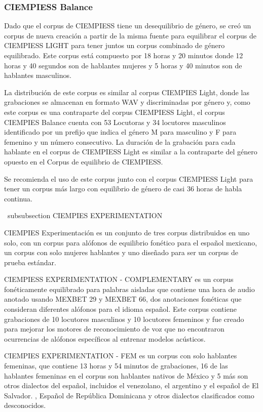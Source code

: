 \documentclass[a4paper,12pt,twoside]{report}
\begin{document}
\subsubsection{CIEMPIESS Balance}

Dado que el corpus de CIEMPIESS tiene un desequilibrio de género, se creó un corpus de nueva creación a partir de la misma fuente para equilibrar el corpus de CIEMPIESS LIGHT para tener juntos un corpus combinado de género equilibrado. Este corpus está compuesto por 18 horas y 20 minutos donde 12 horas y 40 segundos son de hablantes mujeres y 5 horas y 40 minutos son de hablantes masculinos.

La distribución de este corpus es similar al corpus CIEMPIES Light, donde las grabaciones se almacenan en formato WAV y discriminadas por género y, como este corpus es una contraparte del corpus CIEMPIESS Light, el corpus CIEMPIES Balance cuenta con 53 Locutoras y 34 locutores masculinos identificado por un prefijo que indica el género M para masculino y F para femenino y un número consecutivo. La duración de la grabación para cada hablante en el corpus de CIEMPIESS Light es similar a la contraparte del género opuesto en el Corpus de equilibrio de CIEMPIESS.

Se recomienda el uso de este corpus junto con el corpus CIEMPIESS Light para tener un corpus más largo con equilibrio de género de casi 36 horas de habla continua.

\ subsubsection {CIEMPIES EXPERIMENTATION }

CIEMPIES Experimentación es un conjunto de tres corpus distribuidos en uno solo, con un corpus para alófonos de equilibrio fonético para el español mexicano, un corpus con solo mujeres hablantes y uno diseñado para ser un corpus de prueba estándar.

CIEMPIESS EXPERIMENTATION - COMPLEMENTARY es un corpus fonéticamente equilibrado para palabras aisladas que contiene una hora de audio anotado usando MEXBET 29 y MEXBET 66, dos anotaciones fonéticas que consideran diferentes alófonos para el idioma español. Este corpus contiene grabaciones de 10 locutores masculinos y 10 locutores femeninos y fue creado para mejorar los motores de reconocimiento de voz que no encontraron ocurrencias de alófonos específicos al entrenar modelos acústicos.

CIEMPIES EXPERIMENTATION  - FEM es un corpus con solo hablantes femeninas, que contiene 13 horas y 54 minutos de grabaciones, 16 de las hablantes femeninas en el corpus son hablantes nativos de México y 5 más son otros dialectos del español, incluidos el venezolano, el argentino y el español de El Salvador. , Español de República Dominicana y otros dialectos clasificados como desconocidos.
\end{document}
